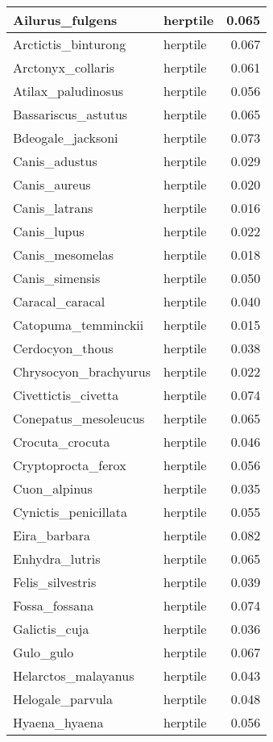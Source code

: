 \begin{table}
\begin{tabular}[t]{l|l|r}
\hline
Ailurus\_fulgens & herptile & 0.065\\
\hline
Arctictis\_binturong & herptile & 0.067\\
\hline
Arctonyx\_collaris & herptile & 0.061\\
\hline
Atilax\_paludinosus & herptile & 0.056\\
\hline
Bassariscus\_astutus & herptile & 0.065\\
\hline
Bdeogale\_jacksoni & herptile & 0.073\\
\hline
Canis\_adustus & herptile & 0.029\\
\hline
Canis\_aureus & herptile & 0.020\\
\hline
Canis\_latrans & herptile & 0.016\\
\hline
Canis\_lupus & herptile & 0.022\\
\hline
Canis\_mesomelas & herptile & 0.018\\
\hline
Canis\_simensis & herptile & 0.050\\
\hline
Caracal\_caracal & herptile & 0.040\\
\hline
Catopuma\_temminckii & herptile & 0.015\\
\hline
Cerdocyon\_thous & herptile & 0.038\\
\hline
Chrysocyon\_brachyurus & herptile & 0.022\\
\hline
Civettictis\_civetta & herptile & 0.074\\
\hline
Conepatus\_mesoleucus & herptile & 0.065\\
\hline
Crocuta\_crocuta & herptile & 0.046\\
\hline
Cryptoprocta\_ferox & herptile & 0.056\\
\hline
Cuon\_alpinus & herptile & 0.035\\
\hline
Cynictis\_penicillata & herptile & 0.055\\
\hline
Eira\_barbara & herptile & 0.082\\
\hline
Enhydra\_lutris & herptile & 0.065\\
\hline
Felis\_silvestris & herptile & 0.039\\
\hline
Fossa\_fossana & herptile & 0.074\\
\hline
Galictis\_cuja & herptile & 0.036\\
\hline
Gulo\_gulo & herptile & 0.067\\
\hline
Helarctos\_malayanus & herptile & 0.043\\
\hline
Helogale\_parvula & herptile & 0.048\\
\hline
Hyaena\_hyaena & herptile & 0.056\\

\end{tabular}
\end{table}
